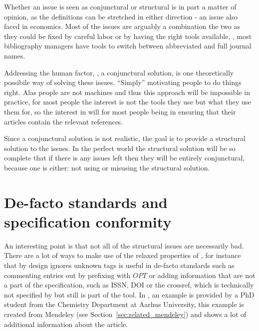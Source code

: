 Whether an issue is seen as conjunctural or structural is in part a
matter of opinion, as the definitions can be stretched in either
direction - an issue also faced in economics.  Most of the issues are
arguably a combination the two as they could be fixed by careful labor
or by having the right tools available, \eg, most bibliography
managers have tools to switch between abbreviated and full journal
names. 

Addressing the human factor, \ie, a conjunctural solution, is one
theoretically possibile way of solving these issues.  ``Simply''
motivating people to do things right.  Alas people are not machines
and thus this approach will be impossible in practice, for most people
the interest is not the tools they use but what they use them for, so
the interest in {\bibtex} will for most people being in ensuring that
their articles contain the relevant references.

Since a conjunctural solution is not realistic, the goal is to provide
a structural solution to the issues.  In the perfect world the
structural solution will be so complete that if there is any issues
left then they will be entirely conjunctural, because one is either:
not using or misusing the structural solution.


\section{De-facto standards and specification conformity}
\label{sec:problems_de_facto}

An interesting point is that not all of the structural issues are
necessarily bad.  There are a lot of ways to make use of the relaxed
properties of {\bibtex}, for instance that by design {\bibtex} ignores
unknown tags is useful in de-facto standards such as commenting
entries out by prefixing with $OPT$ or adding information that are not
a part of the {\bibtex} specification, such as ISSN, DOI or the
crossref, which is technically not specified by {\bibtex} but still is
part of the tool.  In , an example is
provided by a PhD student from the Chemistry Department at Aarhus
University, this example is created from Mendeley (see
Section~\ref{sec:related_mendeley}) and shows a lot of additional
information about the article.

